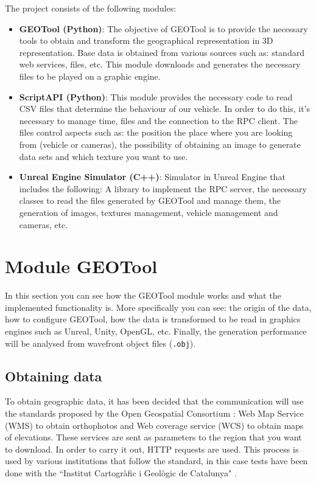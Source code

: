 \documentclass[10pt,a4paper,twocolumn,twoside]{article}
\begin{document}
The project consists of the following modules:

\begin{itemize}
\setlength\itemsep{0em}
  \item \textbf{GEOTool (Python)}: The objective of GEOTool is to provide the necessary tools to obtain and transform the geographical representation in 3D representation. Base data is obtained from various sources such as: standard web services, files, etc. This module downloads and generates the necessary files to be played on a graphic engine.
  
  \item \textbf{ScriptAPI (Python)}: This module provides the necessary code to read CSV files that determine the behaviour of our vehicle. In order to do this, it’s necessary to manage time, files and the connection to the RPC client. The files control aspects such as: the position the place where you are looking from (vehicle or cameras), the possibility of obtaining an image to generate data sets and which texture you want to use.
  
  \item \textbf{Unreal Engine Simulator (C++)}: Simulator in Unreal Engine that includes the following: A library to implement the RPC server, the necessary classes to read the files generated by GEOTool and manage them, the generation of images, textures management, vehicle management and cameras, etc.
\end{itemize}

\section{Module GEOTool}

In this section you can see how the GEOTool module works and what the implemented functionality is. More specifically you can see: the origin of the data, how to configure GEOTool, how the data is transformed to be read in graphics engines such as Unreal, Unity, OpenGL, etc. Finally, the generation performance will be analysed from wavefront object files (\texttt{.obj}).

\subsection{Obtaining data}
\label{getdata}

To obtain geographic data, it has been decided that the communication will use the standards proposed by the Open Geospatial Consortium \cite{ogc}: Web Map Service (WMS) \cite{wms} to obtain orthophotos and Web coverage service (WCS) \cite{wcs} to obtain maps of elevations. These services are sent as parameters to the region that you want to download. In order to carry it out, HTTP requests are used. This process is used by various institutions that follow the standard, in this case tests have been done with the ``Institut Cartogràfic i Geològic de Catalunya" \cite{icgc}.
\end{document}
